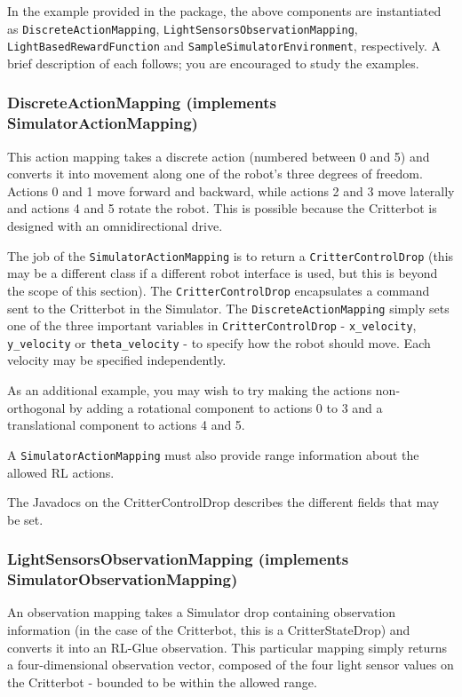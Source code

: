 \documentclass[12pt]{article}
\newcommand{\code}[1]{\texttt{#1}}
\begin{document}
In the example provided in the package, the above components are instantiated
as \code{DiscreteActionMapping}, \code{LightSensorsObservationMapping},
\code{LightBasedRewardFunction} and \code{SampleSimulatorEnvironment},
respectively. A brief description of each follows; you are encouraged to
study the examples.

\subsubsection[DiscreteActionMapping]{DiscreteActionMapping (implements SimulatorActionMapping)}

This action mapping takes a discrete action (numbered between 0 and 5) and
converts it into movement along one of the robot's three degrees of freedom.
Actions 0 and 1 move forward and backward, while actions 2 and 3 move
laterally and actions 4 and 5 rotate the robot. This is possible because the
Critterbot is designed with an omnidirectional drive.

The job of the \code{SimulatorActionMapping} is to return a 
\code{CritterControlDrop} (this may be a different class if a different
robot interface is used, but this is beyond the scope of this section).
The \code{CritterControlDrop} encapsulates a command sent to the Critterbot
in the Simulator. The \code{DiscreteActionMapping} simply sets one of the
three important variables in \code{CritterControlDrop} - \verb+x_velocity+,
\verb+y_velocity+ or \verb+theta_velocity+ - to specify how the robot
should move. Each velocity may be specified independently.

As an additional example, you may wish to try making the actions 
non-orthogonal by adding a rotational component to actions 0 to 3 and a
translational component to actions 4 and 5.

A \code{SimulatorActionMapping} must also provide range information about the
allowed RL actions. 

The Javadocs on the CritterControlDrop describes the different fields
that may be set.

\subsubsection[LightSensorsObservationMapping]{LightSensorsObservationMapping (implements SimulatorObservationMapping)}

An observation mapping takes a Simulator drop containing observation 
information (in the case of the Critterbot, this is a CritterStateDrop)
and converts it into an RL-Glue observation.  This particular mapping simply
returns a four-dimensional observation vector, composed of the four light
sensor values on the Critterbot - bounded to be within the allowed range.
\end{document}
